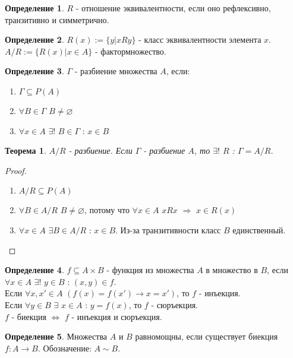 \documentclass[a4paper, 12pt]{article}
\theoremstyle{definition}
\newtheorem*{definition}{Определение}
\theoremstyle{plain}
\newtheorem*{theorem}{Теорема}
\theoremstyle{remark}
\begin{document}
  \begin{definition}
    $R$ - отношение эквивалентности, если оно рефлексивно, транзитивно и симметрично.
  \end{definition}
  \begin{definition}
    $R(x):=\{y|xRy\}$ - класс эквивалентности элемента $x$.\\
    $A/R:=\{R(x)|x\in A\}$ - фактормножество.
  \end{definition}
  \begin{definition}
    $\Gamma$ - разбиение множества $A$, если:
    \begin{enumerate}
        \item $\Gamma\subseteq P(A)$
        \item $\forall B\in \Gamma$ $B\neq\varnothing$
        \item $\forall x\in A$ $\exists!$ $B\in\Gamma$ : $x\in B$
    \end{enumerate}
  \end{definition}
  \begin{theorem}
    $A/R$ - разбиение. Если $\Gamma$ - разбиение $A$, то $\exists!$ $R$ : $\Gamma=A/R$.
  \end{theorem}
  \begin{proof}
    \begin{enumerate} 
      \item $A/R\subseteq P(A)$
      \item $\forall B\in A/R$ $B\neq\varnothing$, потому что $\forall x\in A$ $xRx$ $\Longrightarrow$ $x\in R(x)$
      \item $\forall x\in A $ $\exists B\in A/R$ : $x\in B$. Из-за транзитивности класс $B$ единственный.
    \end{enumerate}
  \end{proof}
  \begin{definition}
    $f\subseteq A\times B$ - функция из множества $A$ в множество в $B$, если $\forall x\in A$ $\exists!$ $y\in B$ : $(x, y)\in f$.\\
    Если $\forall x,x'\in A$ $(f(x)=f(x')\to x=x')$, то $f$ - инъекция.\\
    Если $\forall y\in B$ $\exists$ $x\in A$ : $y=f(x)$, то $f$ - сюръекция.\\
    $f$ - биекция $\Longleftrightarrow$ $f$ - инъекция и сюръекция.
  \end{definition}
  \begin{definition}
    Множества $A$ и $B$ равномощны, если существует биекция $f:A\longrightarrow B$. Обозначение: $A\sim B$.
  \end{definition}
\end{document}
